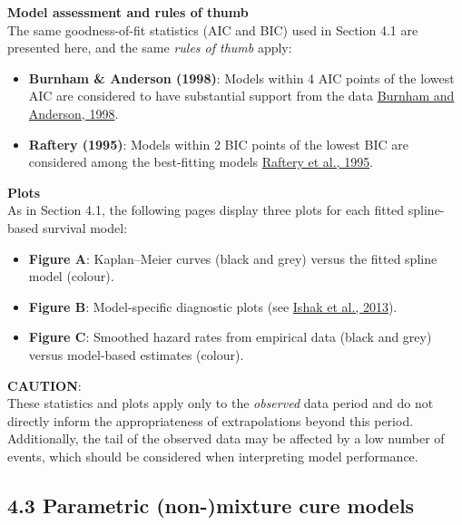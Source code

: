 \documentclass[
]{article}
\providecommand{\tightlist}{%
  \setlength{\itemsep}{0pt}\setlength{\parskip}{0pt}}
\begin{document}
\textbf{Model assessment and rules of thumb}\\
The same goodness-of-fit statistics (AIC and BIC) used in Section 4.1
are presented here, and the same \emph{rules of thumb} apply:

\begin{itemize}
\tightlist
\item
  \textbf{Burnham \& Anderson (1998)}: Models within 4 AIC points of the
  lowest AIC are considered to have substantial support from the data
  \href{https://doi.org/10.1007/978-1-4757-2917-7}{Burnham and Anderson,
  1998}.\\
\item
  \textbf{Raftery (1995)}: Models within 2 BIC points of the lowest BIC
  are considered among the best-fitting models
  \href{https://doi.org/10.2307/271063}{Raftery et al., 1995}.
\end{itemize}

\textbf{Plots}\\
As in Section 4.1, the following pages display three plots for each
fitted spline-based survival model:

\begin{itemize}
\tightlist
\item
  \textbf{Figure A}: Kaplan--Meier curves (black and grey) versus the
  fitted spline model (colour).\\
\item
  \textbf{Figure B}: Model-specific diagnostic plots (see
  \href{https://doi.org/10.1007/s40273-013-0064-3}{Ishak et al.,
  2013}).\\
\item
  \textbf{Figure C}: Smoothed hazard rates from empirical data (black
  and grey) versus model-based estimates (colour).
\end{itemize}

\textbf{CAUTION}:\\
These statistics and plots apply only to the \emph{observed} data period
and do not directly inform the appropriateness of extrapolations beyond
this period.\\
Additionally, the tail of the observed data may be affected by a low
number of events, which should be considered when interpreting model
performance.

\clearpage

\clearpage

\subsection{4.3 Parametric (non-)mixture cure
models}\label{parametric-non-mixture-cure-models}
\end{document}

